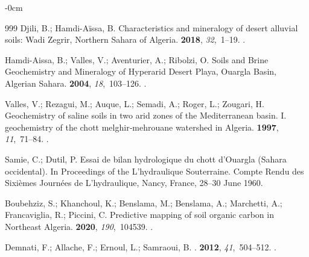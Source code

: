 \documentclass[asi,article,accept,pdftex,moreauthors]{Definitions/mdpi}
\begin{document}
\begin{adjustwidth}{-\extralength}{0cm}
\begin{thebibliography}{999}
Djili, B.; Hamdi-Aïssa, B.
\newblock Characteristics and mineralogy of desert alluvial soils: Wadi Zegrir,
  Northern Sahara of Algeria.
 {\bf 2018}, {\em 32},~1--19.
.

Hamdi-Aissa, B.; Valles, V.; Aventurier, A.; Ribolzi, O.
\newblock Soils and Brine Geochemistry and Mineralogy of Hyperarid Desert
  Playa, Ouargla Basin, Algerian Sahara.
 {\bf 2004}, {\em
  18},~103--126.
.

Valles, V.; Rezagui, M.; Auque, L.; Semadi, A.; Roger, L.; Zougari, H.
\newblock Geochemistry of saline soils in two arid zones of the Mediterranean
  basin. I. geochemistry of the chott melghir‐mehrouane watershed in Algeria.
 {\bf 1997}, {\em
  11},~71--84.
.

Samie, C.; Dutil, P.
\newblock Essai de bilan hydrologique du chott d’Ouargla (Sahara occidental).
\newblock In Proceedings of the L'hydraulique Souterraine. Compte Rendu des
  Sixièmes Journées de L'hydraulique, Nancy, France, 28--30 June 1960. %

Boubehziz, S.; Khanchoul, K.; Benslama, M.; Benslama, A.; Marchetti, A.;
  Francaviglia, R.; Piccini, C.
\newblock Predictive mapping of soil organic carbon in Northeast Algeria.
 {\bf 2020}, {\em 190},~104539.
.

Demnati, F.; Allache, F.; Ernoul, L.; Samraoui, B.
.
 {\bf 2012}, {\em 41},~504--512.
.


\end{thebibliography}
\end{adjustwidth}
\end{document}

